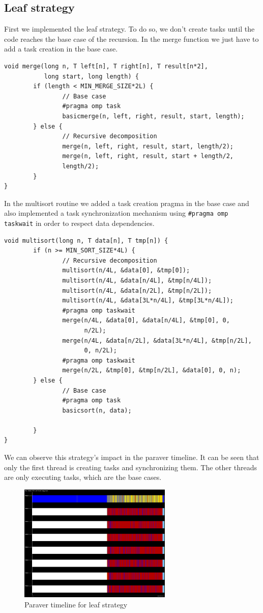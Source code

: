 \documentclass{article}
\begin{document}
\subsection{Leaf strategy}
\justify
First we implemented the leaf strategy. To do so, we don't create tasks until
the code reaches the base case of the recursion. In the merge function we just have to add a task creation in the base case.
\begin{lstlisting}
void merge(long n, T left[n], T right[n], T result[n*2], 
           long start, long length) {
        if (length < MIN_MERGE_SIZE*2L) {
                // Base case
                #pragma omp task 
                basicmerge(n, left, right, result, start, length);
        } else {
                // Recursive decomposition
                merge(n, left, right, result, start, length/2);
                merge(n, left, right, result, start + length/2, 
                length/2);
        }
}
\end{lstlisting}
\justify
In the multisort routine we added a task creation pragma in the base case and also implemented a task synchronization mechanism using \texttt{\#pragma omp taskwait} in order to respect data dependencies. 
\begin{lstlisting}
void multisort(long n, T data[n], T tmp[n]) {
        if (n >= MIN_SORT_SIZE*4L) {
                // Recursive decomposition
                multisort(n/4L, &data[0], &tmp[0]);
                multisort(n/4L, &data[n/4L], &tmp[n/4L]);
                multisort(n/4L, &data[n/2L], &tmp[n/2L]);
                multisort(n/4L, &data[3L*n/4L], &tmp[3L*n/4L]);
                #pragma omp taskwait
                merge(n/4L, &data[0], &data[n/4L], &tmp[0], 0, 
                      n/2L);
                merge(n/4L, &data[n/2L], &data[3L*n/4L], &tmp[n/2L], 
                      0, n/2L);
                #pragma omp taskwait
                merge(n/2L, &tmp[0], &tmp[n/2L], &data[0], 0, n);
        } else {
                // Base case
                #pragma omp task 
                basicsort(n, data);

        }
}
\end{lstlisting}
\clearpage
We can observe this strategy's impact in the paraver timeline. It can be seen that only the first thread is creating tasks and synchronizing them. The other threads are only executing tasks, which are the base cases.
\begin{figure}[!h]
    \centering
    \includegraphics[width=0.65\textwidth]{paraver_noCFG_leafNC.png}
    \caption{Paraver timeline for leaf strategy}
    \label{fig:tareador}
\end{figure}
\end{document}
